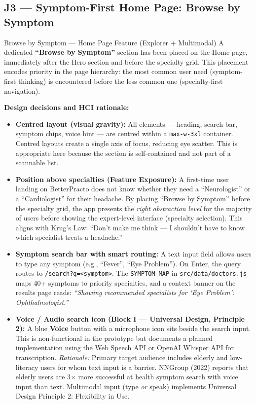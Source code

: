 \documentclass[12pt, a4paper]{article}
\begin{document}
\subsection{J3 --- Symptom-First Home Page: Browse by Symptom}

\begin{featurebox}{Browse by Symptom --- Home Page Feature (Explorer + Multimodal)}
A dedicated \textbf{``Browse by Symptom''} section has been placed on the Home page, immediately after the Hero section and before the specialty grid. This placement encodes priority in the page hierarchy: the most common user need (symptom-first thinking) is encountered before the less common one (specialty-first navigation).

\textbf{Design decisions and HCI rationale:}
\begin{itemize}[leftmargin=1.5em, itemsep=0pt]
  \item \textbf{Centred layout (visual gravity):} All elements --- heading, search bar, symptom chips, voice hint --- are centred within a \texttt{max-w-3xl} container. Centred layouts create a single axis of focus, reducing eye scatter. This is appropriate here because the section is self-contained and not part of a scannable list.
  \item \textbf{Position above specialties (Feature Exposure):} A first-time user landing on BetterPracto does not know whether they need a ``Neurologist'' or a ``Cardiologist'' for their headache. By placing ``Browse by Symptom'' before the specialty grid, the app presents the \emph{right abstraction level} for the majority of users before showing the expert-level interface (specialty selection). This aligns with Krug's Law: ``Don't make me think --- I shouldn't have to know which specialist treats a headache.''
  \item \textbf{Symptom search bar with smart routing:} A text input field allows users to type any symptom (e.g., ``Fever'', ``Eye Problem''). On Enter, the query routes to \texttt{/search?q=<symptom>}. The \texttt{SYMPTOM\_MAP} in \texttt{src/data/doctors.js} maps 40+ symptoms to priority specialties, and a context banner on the results page reads: \textit{``Showing recommended specialists for `Eye Problem': Ophthalmologist.''}
  \item \textbf{Voice / Audio search icon (Block I --- Universal Design, Principle 2):} A blue \textbf{Voice} button with a microphone icon sits beside the search input. This is non-functional in the prototype but documents a planned implementation using the Web Speech API or OpenAI Whisper API for transcription. \textit{Rationale:} Primary target audience includes elderly and low-literacy users for whom text input is a barrier. NNGroup (2022) reports that elderly users are 3$\times$ more successful at health symptom search with voice input than text. Multimodal input (type \emph{or} speak) implements Universal Design Principle 2: Flexibility in Use.

\end{itemize}
\end{featurebox}
\end{document}
